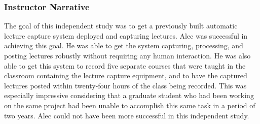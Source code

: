 
\subsubsection*{Instructor Narrative}
The goal of this independent study was to get a previously built
automatic lecture capture system deployed and capturing lectures. Alec
was successful in achieving this goal. He was able to get the system
capturing, processing, and posting lectures robustly without requiring
any human interaction. He was also able to get this system to record
five separate courses that were taught in the classroom containing
the lecture capture equipment, and to have the captured lectures
posted within twenty-four hours of the class being recorded. This was
especially impressive considering that a graduate student who had been
working on the same project had been unable to accomplish this same task
in a period of two years. Alec could not have been more successful in
this independent study.


